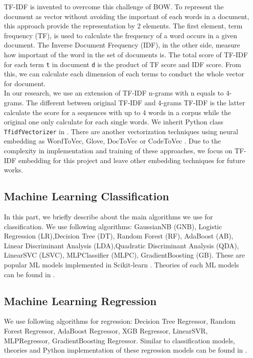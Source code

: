 TF-IDF \cite{008} is invented to overcome this challenge of BOW. To represent the document as vector without avoiding the important of each words in a document, this approach provide the representation by 2 elements. The first element, term frequency (TF), is used to calculate the frequency of a word occurs in a given document. The Inverse Document Frequency (IDF), in the other side, measure how important of the word in the set of documents is. The total score of TF-IDF for each term \texttt{t} in document \texttt{d} is the product of TF score and IDF score. From this, we can calculate each dimension of each terms to conduct the whole vector for document.
\\
In our research, we use an extension of TF-IDF n-grams with n equals to 4-grams. The different between original TF-IDF and 4-grams TF-IDF is the latter calculate the score for a sequences with up to 4 words in a corpus while the original one only calculate for each single words. We inherit Python class \texttt{TfidfVectorizer} in \cite{009}. There are another vectorization techniques using neural embedding as WordToVec, Glove, DocToVec or CodeToVec \cite{013}. Due to the complexity in implementation and training of these approaches, we focus on TF-IDF embedding for this project and leave other embedding techniques for future works.


\subsection{Machine Learning Classification}
In this part, we briefly describe about the main algorithms we use for classification. We use following algorithms: GaussianNB (GNB), Logistic Regression (LR),Decision Tree (DT),
Random Forest (RF), AdaBoost (AB), Linear Discriminant Analysis (LDA),Quadratic Discriminant Analysis (QDA),
LinearSVC (LSVC), MLPClassifier (MLPC), GradientBoosting (GB). These are popular ML models implemented in Scikit-learn \cite{010}. Theories of each ML models can be found in \cite{011,012}. 


\subsection{Machine Learning Regression}
We use following algorithms for regression: Decision Tree Regressor, Random Forest Regressor, AdaBoost Regressor,
XGB Regressor,
LinearSVR, MLPRegressor, GradientBoosting Regressor. Similar to classification models, theories and Python implementation of these regression models can be found in \cite{010,011,012}.


